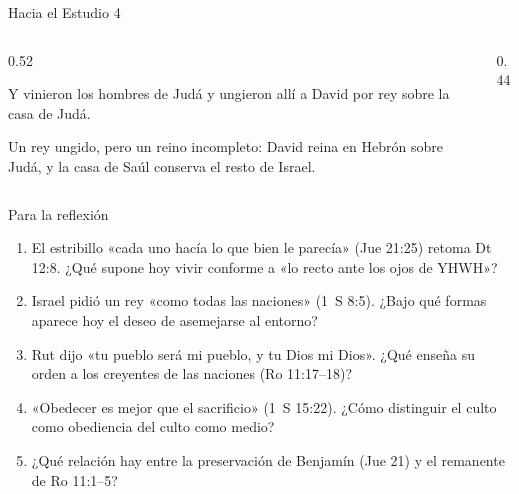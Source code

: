 \begin{frame}{Hacia el Estudio 4}
\begin{columns}[c,onlytextwidth]
\begin{column}{0.52\textwidth}
\begin{cita}Y vinieron los hombres de Judá y ungieron allí a David por rey sobre la casa de Judá.\end{cita}
\small Un rey ungido, pero un reino incompleto: David reina en Hebrón sobre Judá, y la casa de Saúl conserva el resto de Israel.
\end{column}
\begin{column}{0.44\textwidth}
\centering
{}
\elabpropia
\end{column}
\end{columns}
\end{frame}

\begin{frame}{Para la reflexión}
\small
\begin{enumerate}
\item El estribillo «cada uno hacía lo que bien le parecía» (Jue 21:25) retoma Dt 12:8. ¿Qué supone hoy vivir conforme a «lo recto ante los ojos de YHWH»?
\item Israel pidió un rey «como todas las naciones» (1~S 8:5). ¿Bajo qué formas aparece hoy el deseo de asemejarse al entorno?
\item Rut dijo «tu pueblo será mi pueblo, y tu Dios mi Dios». ¿Qué enseña su orden a los creyentes de las naciones (Ro 11:17--18)?
\item «Obedecer es mejor que el sacrificio» (1~S 15:22). ¿Cómo distinguir el culto como obediencia del culto como medio?
\item ¿Qué relación hay entre la preservación de Benjamín (Jue 21) y el remanente de Ro 11:1--5?
\end{enumerate}
\end{frame}

